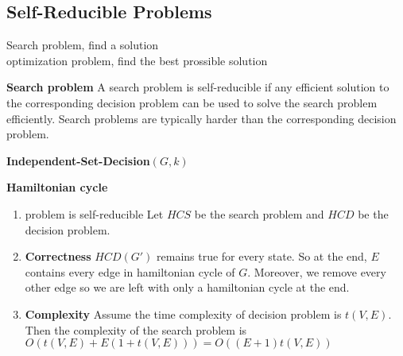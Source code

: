 \documentclass[11pt]{article}
\begin{document}
\subsection*{Self-Reducible Problems}

Search problem, find a solution \\ 
optimization problem, find the best prossible solution 


\begin{defn*}
    \textbf{Search problem}
    A search problem is self-reducible if any efficient solution to the corresponding decision problem can be used to solve the search problem efficiently.  Search problems are typically harder than the corresponding decision problem. 
\end{defn*}

\begin{defn*}
    \textbf{Independent-Set-Decision}$(G, k)$ 
\end{defn*}

\begin{example}
    \textbf{Hamiltonian cycle} \\

    \begin{enumerate}
        \item problem is self-reducible Let $HCS$ be the search problem and $HCD$ be the decision problem. 
        \item \textbf{Correctness} $HCD(G')$ remains true for every state. So at the end, $E$ contains every edge in hamiltonian cycle of $G$. Moreover, we remove every other edge so we are left with only a hamiltonian cycle at the end. 
        \item \textbf{Complexity} Assume the time complexity of decision problem is $t(V, E)$. Then the complexity of the search problem is $O(t(V,E) + E(1 + t(V,E))) = O((E+1)t(V,E))$
    \end{enumerate}

    \begin{algorithm}[H]

        \\
    \end{algorithm}
\end{example}
\end{document}
